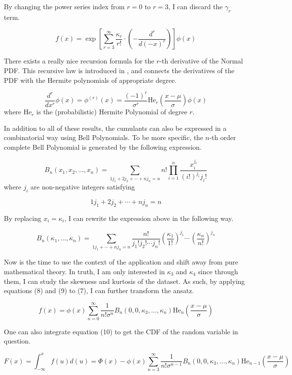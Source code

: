 By changing the power series index from $r=0$ to $r=3$, I can discard the $\gamma_r$ term. 

\[
	f(x) = \exp \left[ \sum_{r=3}^{\infty} \frac{\kappa_r}{r!} \cdot \left( - \frac{d^r}{d(-x)^r} \right) \right] \phi(x) \tag{7}
\]

There exists a really nice recursion formula for the $r$-th derivative of the Normal PDF. This recursive law is introduced in \cite{patel1996handbook}, and connects the derivatives of the PDF with the Hermite polynomials of appropriate degree.

\[
	\frac{d^r}{dx^r} \phi(x) = \phi^{(r)}(x) = \frac{(-1)^r}{\sigma^r} \text{He}_r \left(\frac{x - \mu}{\sigma} \right) \phi(x) \tag{8}
\]
where $\text{He}_r$ is the (probabilistic) Hermite Polynomial of degree $r$.

In addition to all of these results, the cumulants can also be expressed in a combinatorial way using Bell Polynomials. To be more specific, the $n$-th order complete Bell Polynomial is generated by the following expression.

\[ 
	B_n(x_1, x_2, \dots, x_n) = \sum_{1j_1 + 2j_2 + \cdots + nj_n = n} n! \prod_{i=1}^{n} \frac{x_{i}^{j_i}}{(i!)^{j_i} j_i !}
\]
where $j_i$ are non-negative integers satisfying

\[ 
	1j_1 + 2j_2 + \cdots + nj_n = n
\]

By replacing $x_i = \kappa_i$, I can rewrite the expression above in the following way.

\[  
	B_n(\kappa_1, \dots, \kappa_n) = \sum_{1j_1 + \cdots + nj_n = n} \frac{n!}{j_1! j_2! \cdots j_n!} \left( \frac{\kappa_1}{1!} \right)^{j_1} \cdots \, \left( \frac{\kappa_n}{n!} \right)^{j_n} \tag{9}
\]

Now is the time to use the context of the application and shift away from pure mathematical theory. In truth, I am only interested in $\kappa_3$ and $\kappa_4$ since through them, I can study the skewness and kurtosis of the dataset. As such, by applying equations (8) and (9) to (7), I can further transform the ansatz.

\[
	f(x) = \phi(x) \sum_{n=0}^{\infty} \frac{1}{n! \sigma^n} B_n(0, 0, \kappa_3, \dots, \kappa_n) \text{He}_n \left( \frac{x - \mu}{\sigma} \right) \tag{10}
\]

One can also integrate equation (10) to get the CDF of the random variable in question.

\[
	F(x) = \int_{-\infty}^{x} f(u)d(u) = \Phi(x) - \phi(x) \sum_{n=3}^{\infty} \frac{1}{n! \sigma^{n-1}} B_n(0, 0, \kappa_3, \dots, \kappa_n) \text{He}_{n-1} \left( \frac{x-\mu}{\sigma} \right) \tag{11}
\]

